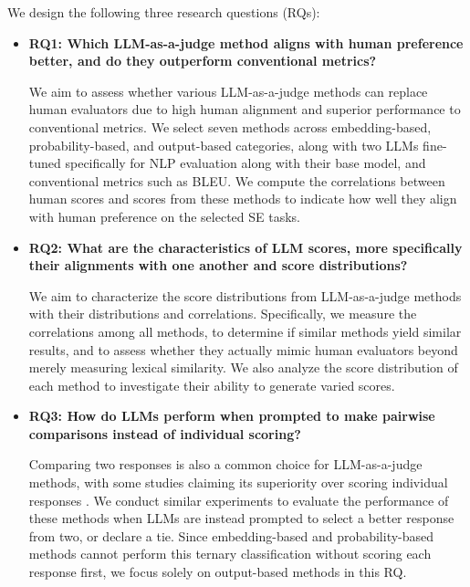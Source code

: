 We design the following three research questions (RQs):

\begin{itemize}
    \item \textbf{RQ1: Which LLM-as-a-judge method aligns with human preference better, and do they outperform conventional metrics?} 

    We aim to assess whether various LLM-as-a-judge methods can replace human evaluators due to high human alignment and superior performance to conventional metrics. We select seven methods across embedding-based, probability-based, and output-based categories, along with two LLMs fine-tuned specifically for NLP evaluation along with their base model, and conventional metrics such as BLEU. We compute the correlations between human scores and scores from these methods to indicate how well they align with human preference on the selected SE tasks.

    \item \textbf{RQ2: What are the characteristics of LLM scores, more specifically their alignments with one another and score distributions?} 

    We aim to characterize the score distributions from LLM-as-a-judge methods with their distributions and correlations. Specifically, we measure the correlations among all methods, to determine if similar methods yield similar results, and to assess whether they actually mimic human evaluators beyond merely measuring lexical similarity. We also analyze the score distribution of each method to investigate their ability to generate varied scores. 

    \item \textbf{RQ3: How do LLMs perform when prompted to make pairwise comparisons instead of individual scoring?} 

    Comparing two responses is also a common choice for LLM-as-a-judge methods, with some studies claiming its superiority over scoring individual responses \cite{DBLP:journals/corr/abs-2310-01432}. We conduct similar experiments to evaluate the performance of these methods when LLMs are instead prompted to select a better response from two, or declare a tie. Since embedding-based and probability-based methods cannot perform this ternary classification without scoring each response first, we focus solely on output-based methods in this RQ. 

\end{itemize}

